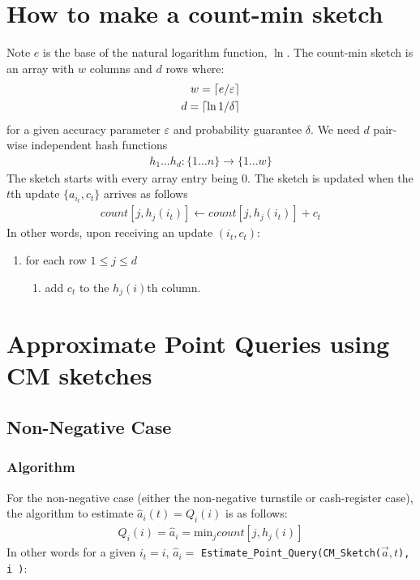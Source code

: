 \documentclass[11pt]{article}
\newcommand{\sq}{\mathit{Q}_i}
\DeclarePairedDelimiter\ceil{\lceil}{\rceil}
\newcommand{\ra}{\rightarrow}
\begin{document}
\section{How to make a count-min sketch}
Note $e$ is the base of the natural logarithm function, $\ln$. The count-min
sketch is an array with $w$ columns and $d$ rows where:
\begin{align}
    w = \ceil{e/\varepsilon}\\
    d = \ceil{\ln{1/\delta}}
\end{align}
for a given accuracy parameter $\varepsilon$ and probability guarantee $\delta$.
We need $d$ pair-wise independent hash functions
\begin{align}
    h_1 \dots h_d : \{1 \dots n\} \ra \{1 \dots w\} 
\end{align}
The sketch starts with every array entry being 0. The sketch is updated when the $t$th update $\{a_{i_t}, c_t\}$
arrives as follows
\begin{align}
    count[j, h_j(i_t)] \leftarrow count[j, h_j(i_t)] + c_t     
\end{align}
In other words, upon receiving an update $(i_t, c_t)$:
\begin{enumerate}
    \item for each row $1 \leq j \leq d$
    \begin{enumerate}
        \item add $c_t$ to the $h_j(i)$th column.
    \end{enumerate}
\end{enumerate}

\section{Approximate Point Queries using CM sketches}

\subsection{Non-Negative Case}
\subsubsection{Algorithm}
For the non-negative case (either the non-negative turnstile or cash-register case),
the algorithm to estimate $\hat{a}_i(t) = \sq(i)$ is as follows: 
\begin{align}
    \sq(i) = \hat{a}_i = \text{min}_j count[j, h_j(i)]
\end{align}
In other words for a given $i_t = i$, $\hat a_i =$ \texttt{Estimate\_Point\_Query(CM\_Sketch($\vec{a}, t$), i )}:
\end{document}
